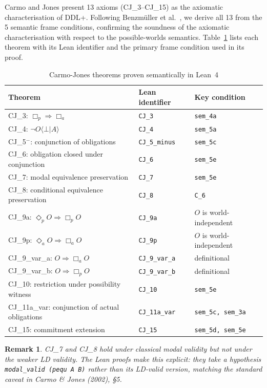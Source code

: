 \documentclass[]{article}
\newtheorem{remark}[theorem]{Remark}
\newcommand{\code}[1]{\texttt{#1}}
\newcommand{\DDL}{\textup{DDL+}}
\begin{document}
Carmo and Jones \cite{CarmoJones2002} present 13 axioms (CJ\_3--CJ\_15) as the
axiomatic characterisation of \DDL{}.  Following Benzm{\"u}ller et al.\
\cite{Benzmuller2018}, we derive all 13 from the 5 semantic frame conditions,
confirming the soundness of the axiomatic characterisation with respect to
the possible-worlds semantics.
Table~\ref{tab:cj} lists each theorem with its Lean identifier and the
primary frame condition used in its proof.

\begin{longtable}{lll}
\caption{Carmo-Jones theorems proven semantically in Lean~4}\label{tab:cj}\\
\textbf{Theorem} & \textbf{Lean identifier} & \textbf{Key condition} \\
\hline
CJ\_3: $\Box_p \Rightarrow \Box_a$ & \code{CJ\_3} & \code{sem\_4a} \\
CJ\_4: $\neg O\langle \bot | A \rangle$ & \code{CJ\_4} & \code{sem\_5a} \\
CJ\_5$^-$: conjunction of obligations & \code{CJ\_5\_minus} & \code{sem\_5c} \\
CJ\_6: obligation closed under conjunction & \code{CJ\_6} & \code{sem\_5e} \\
CJ\_7: modal equivalence preservation & \code{CJ\_7} & \code{sem\_5e} \\
CJ\_8: conditional equivalence preservation & \code{CJ\_8} & \code{C\_6} \\
CJ\_9a: $\Diamond_p O \Rightarrow \Box_p O$ & \code{CJ\_9a} & $O$ is world-independent \\
CJ\_9p: $\Diamond_a O \Rightarrow \Box_a O$ & \code{CJ\_9p} & $O$ is world-independent \\
CJ\_9\_var\_a: $O \Rightarrow \Box_a O$ & \code{CJ\_9\_var\_a} & definitional \\
CJ\_9\_var\_b: $O \Rightarrow \Box_p O$ & \code{CJ\_9\_var\_b} & definitional \\
CJ\_10: restriction under possibility witness & \code{CJ\_10} & \code{sem\_5e} \\
CJ\_11a\_var: conjunction of actual obligations & \code{CJ\_11a\_var} & \code{sem\_5c, sem\_3a} \\
CJ\_15: commitment extension & \code{CJ\_15} & \code{sem\_5d, sem\_5e} \\
\hline
\end{longtable}

\begin{remark}
CJ\_7 and CJ\_8 hold under \emph{classical modal validity} but not under the
weaker LD validity.  The Lean proofs make this explicit: they take a hypothesis
\code{modal\_valid (pequ A B)} rather than its LD-valid version, matching the
standard caveat in Carmo \& Jones (2002), §5.
\end{remark}
\end{document}

